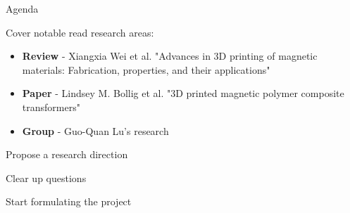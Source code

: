\begin{frame}{Agenda}

Cover notable read research areas:
\begin{itemize}
    \item \textbf{Review} - Xiangxia Wei et al. "Advances in 3D printing of magnetic materials: Fabrication, properties, and their applications"
    \item \textbf{Paper} - Lindsey M. Bollig et al. "3D printed magnetic polymer composite transformers"
    \item \textbf{Group} - Guo-Quan Lu's research
\end{itemize}

Propose a research direction

Clear up questions

Start formulating the project

\end{frame}